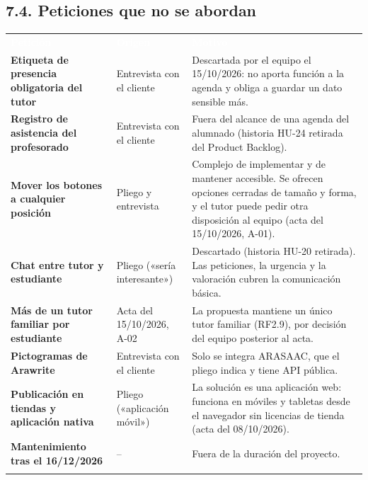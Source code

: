 \documentclass[11pt,a4paper]{article}
\newcommand{\hl}[1]{\textcolor{gblue}{\textbf{#1}}}
\begin{document}
\subsection*{7.4. Peticiones que no se abordan}
{\small\par\noindent\begin{tabular}{@{}>{\raggedright\arraybackslash}p{}>{\raggedright\arraybackslash}p{}>{\raggedright\arraybackslash}p{}@{}}
\rowcolor{gblue}\textcolor{white}{\textbf{Petición}} & \textcolor{white}{\textbf{Origen}} & \textcolor{white}{\textbf{Motivo}} \\
\hl{Etiqueta de presencia obligatoria del tutor} & Entrevista con el cliente & Descartada por el equipo el 15/10/2026: no aporta función a la agenda y obliga a guardar un dato sensible más. \\ \arrayrulecolor{gline}\hline
\rowcolor{glight}
\hl{Registro de asistencia del profesorado} & Entrevista con el cliente & Fuera del alcance de una agenda del alumnado (historia HU-24 retirada del Product Backlog). \\ \arrayrulecolor{gline}\hline
\hl{Mover los botones a cualquier posición} & Pliego y entrevista & Complejo de implementar y de mantener accesible. Se ofrecen opciones cerradas de tamaño y forma, y el tutor puede pedir otra disposición al equipo (acta del 15/10/2026, A-01). \\ \arrayrulecolor{gline}\hline
\rowcolor{glight}
\hl{Chat entre tutor y estudiante} & Pliego («sería interesante») & Descartado (historia HU-20 retirada). Las peticiones, la urgencia y la valoración cubren la comunicación básica. \\ \arrayrulecolor{gline}\hline
\hl{Más de un tutor familiar por estudiante} & Acta del 15/10/2026, A-02 & La propuesta mantiene un único tutor familiar (RF2.9), por decisión del equipo posterior al acta. \\ \arrayrulecolor{gline}\hline
\rowcolor{glight}
\hl{Pictogramas de Arawrite} & Entrevista con el cliente & Solo se integra ARASAAC, que el pliego indica y tiene API pública. \\ \arrayrulecolor{gline}\hline
\hl{Publicación en tiendas y aplicación nativa} & Pliego («aplicación móvil») & La solución es una aplicación web: funciona en móviles y tabletas desde el navegador sin licencias de tienda (acta del 08/10/2026). \\ \arrayrulecolor{gline}\hline
\rowcolor{glight}
\hl{Mantenimiento tras el 16/12/2026} & -- & Fuera de la duración del proyecto. \\ \arrayrulecolor{gline}\hline
\end{tabular}\par}\medskip
\end{document}
